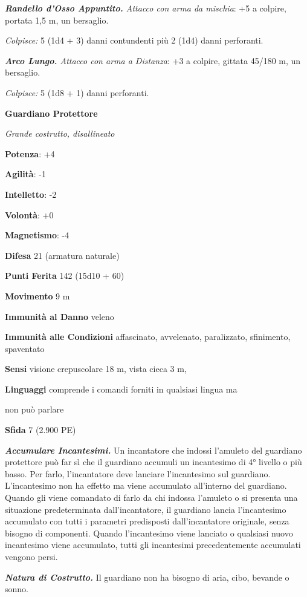 \begin{multicols}{2}
\emph{\textbf{Randello d'Osso Appuntito.} Attacco con arma da mischia}:
+5 a colpire, portata 1,5 m, un bersaglio.

\emph{Colpisce:} 5 (1d4 + 3) danni contundenti più 2 (1d4) danni
perforanti.

\emph{\textbf{Arco Lungo.} Attacco con arma a Distanza}: +3 a colpire,
gittata 45/180 m, un bersaglio.

\emph{Colpisce:} 5 (1d8 + 1) danni perforanti.

\textbf{Guardiano Protettore}

\emph{Grande costrutto, disallineato}

\textbf{Potenza}: +4

\textbf{Agilità}: -1

\textbf{Intelletto}: -2

\textbf{Volontà}: +0

\textbf{Magnetismo}: -4

\textbf{Difesa} 21 (armatura naturale)

\textbf{Punti Ferita} 142 (15d10 + 60)

\textbf{Movimento} 9 m

\textbf{Immunità al Danno} veleno

\textbf{Immunità alle Condizioni} affascinato, avvelenato, paralizzato,
sfinimento, spaventato

\textbf{Sensi} visione crepuscolare 18 m, vista cieca 3 m, 

\textbf{Linguaggi} comprende i comandi forniti in qualsiasi lingua ma

non può parlare

\textbf{Sfida} 7 (2.900 PE)

\emph{\textbf{Accumulare Incantesimi.}} Un incantatore che indossi
l'amuleto del guardiano protettore può far sì che il guardiano accumuli
un incantesimo di 4° livello o più basso. Per farlo, l'incantatore deve
lanciare l'incantesimo sul guardiano. L'incantesimo non ha effetto ma
viene accumulato all'interno del guardiano. Quando gli viene comandato
di farlo da chi indossa l'amuleto o si presenta una situazione
predeterminata dall'incantatore, il guardiano lancia l'incantesimo
accumulato con tutti i parametri predisposti dall'incantatore originale,
senza bisogno di componenti. Quando l'incantesimo viene lanciato o
qualsiasi nuovo incantesimo viene accumulato, tutti gli incantesimi
precedentemente accumulati vengono persi.

\emph{\textbf{Natura di Costrutto.}} Il guardiano non ha bisogno di
aria, cibo, bevande o sonno.


\end{multicols}
